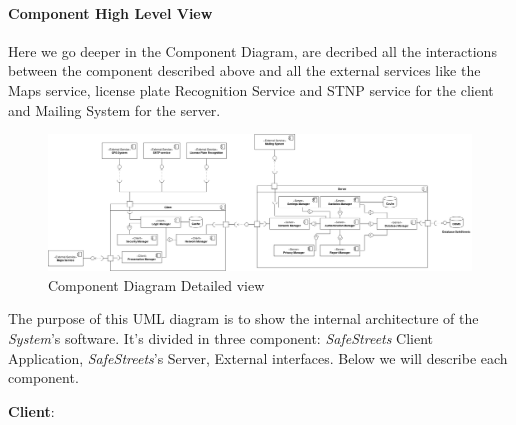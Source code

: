 \documentclass{article}
\begin{document}
\paragraph{Component High Level View}
Here we go deeper in the Component Diagram, are decribed all the interactions between the component
described above and all the external services like the Maps service, license plate Recognition Service and 
STNP service for the client and Mailing System for the server.

\begin{figure}[H]
    \includegraphics[width=1.2\textwidth, left]{img/component_diagrams/component_diagram_complete.png}
    \caption{Component Diagram Detailed view}
\end{figure}

The purpose of this UML diagram is to show the internal architecture of the \textit{System}'s software. It's divided in 
three component: \textit{SafeStreets} Client Application, \textit{SafeStreets}'s Server, External interfaces.
Below we will describe each component. 

\textbf{Client}:
\end{document}
